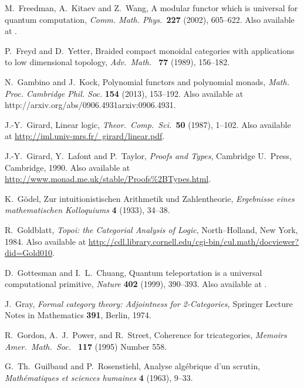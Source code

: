 \documentclass[12pt,twoside,openright]{report}
\begin{document}
\begin{thebibliography}{99}
M.\ Freedman, A.\ Kitaev and Z.\ Wang, A modular functor which is universal for quantum computation, {\sl Comm. Math. Phys.\ }{\bf 227}
(2002), 605--622.  Also available at .

P.\ Freyd and D.\ Yetter, Braided compact monoidal categories with applications to low dimensional topology,
\textsl{Adv.\ Math.\ } {\bf 77} (1989), 156--182.

 N.\ Gambino and J.\ Kock, Polynomial functors and polynomial monads,
{\sl Math. Proc. Cambridge Phil. Soc.} \textbf{154} (2013), 153--192. Also available at {http://arxiv.org/abs/0906.4931}{arxiv:0906.4931}.

 J.-Y.\ Girard, Linear logic, {\sl Theor.\ Comp.\ 
Sci.\ }{\bf 50} (1987), 1--102.  Also available at \hfill \break
\href{http://iml.univ-mrs.fr/~girard/linear.pdf}
{http://iml.univ-mrs.fr/~girard/linear.pdf}.

 J.-Y.\ Girard, Y.\ Lafont and P.\ Taylor, {\sl Proofs and Types}, Cambridge U.\ Press, Cambridge, 1990. Also available at \href{http://www.monad.me.uk/stable/Proofs\%2BTypes.html}
{http://www.monad.me.uk/stable/Proofs\%2BTypes.html}.

 K.\ G\"odel, Zur intuitionistischen Arithmetik und Zahlentheorie, {\sl Ergebnisse eines mathematischen Kolloquiums} {\bf 4} (1933), 34--38.
 
 R.\ Goldblatt, {\sl Topoi: the Categorial Analysis of Logic}, North--Holland, New York, 1984. Also available at
\href{http://cdl.library.cornell.edu/cgi-bin/cul.math/docviewer?did=Gold010}
{http://cdl.library.cornell.edu/cgi-bin/cul.math/docviewer?did=Gold010}.

 D.\ Gottesman and I.~L.~Chuang, Quantum teleportation is a universal computational primitive, 
{\sl Nature} {\bf 402} (1999), 390--393. Also available at \quantph{9908010}.

 J.\ Gray, {\sl Formal category theory: Adjointness for 2-Categories,} Springer Lecture Notes in Mathematics \textbf{391}, Berlin, 1974.

 R.\ Gordon, A.\ J.\ Power, and R.\ Street, Coherence for tricategories, \textsl{Memoirs Amer.\ Math.\  Soc.\ } \textbf{117} (1995) Number 558.

 G.\ Th.\ Guilbaud and P.\ Rosenstiehl, Analyse alg\'ebrique d'un scrutin, \textsl{Math\'ematiques et sciences humaines} \textbf{4} (1963), 9--33.


\end{thebibliography}
\end{document}
